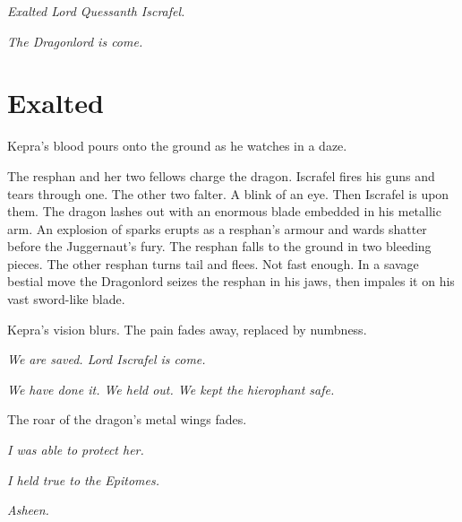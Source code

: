 \documentclass
  [a4paper,
   12pt,
   oneside
  ]%
  {article}
\begin{document}
\emph{Exalted Lord Quessanth Iscrafel.} 

\emph{The Dragonlord is come.}

% 
% 

\section{Exalted}
Kepra’s blood pours onto the ground as he watches in a daze.

The resphan and her two fellows charge the dragon. 
Iscrafel fires his guns and tears through one. 
The other two falter.
A blink of an eye.
Then Iscrafel is upon them. 
The dragon lashes out with an enormous blade embedded in his metallic arm. 
An explosion of sparks erupts as a resphan’s armour and wards shatter before the Juggernaut’s fury. 
The resphan falls to the ground in two bleeding pieces. 
The other resphan turns tail and flees. 
Not fast enough. 
In a savage bestial move the Dragonlord seizes the resphan in his jaws, then impales it on his vast sword-like blade. 

Kepra’s vision blurs. 
The pain fades away, replaced by numbness.

\emph{We are saved. Lord Iscrafel is come.}

\emph{We have done it. We held out. We kept the hierophant safe.}

The roar of the dragon’s metal wings fades. 

\emph{I was able to protect her.}

\emph{I held true to the Epitomes.}

\emph{Asheen.}
\end{document}
